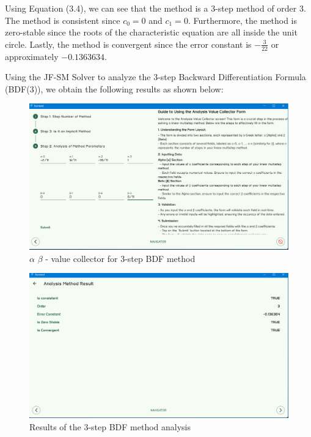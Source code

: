 Using Equation (3.4), we can see that the method is a 3-step method of order 3. The method is consistent since \(c_0 = 0\) and \(c_1 = 0\). Furthermore, the method is zero-stable since the roots of the characteristic equation are all inside the unit circle. Lastly, the method is convergent since the error constant is \(-\frac{3}{22}\) or approximately \(-0.1363634\).

Using the JF-SM Solver to analyze the 3-step Backward Differentiation Formula (BDF(3)), we obtain the following results as shown below:

\begin{figure}[htbp]
    \centering
    \includegraphics[width=1\textwidth]{chapters/4/image/5.png}
    \caption{$\alpha$ $\beta$ - value collector for 3-step BDF method}
\end{figure}

\begin{figure}[htbp]
    \centering
    \includegraphics[width=1\textwidth]{chapters/4/image/6.png}
    \caption{Results of the 3-step BDF method analysis}
\end{figure}



